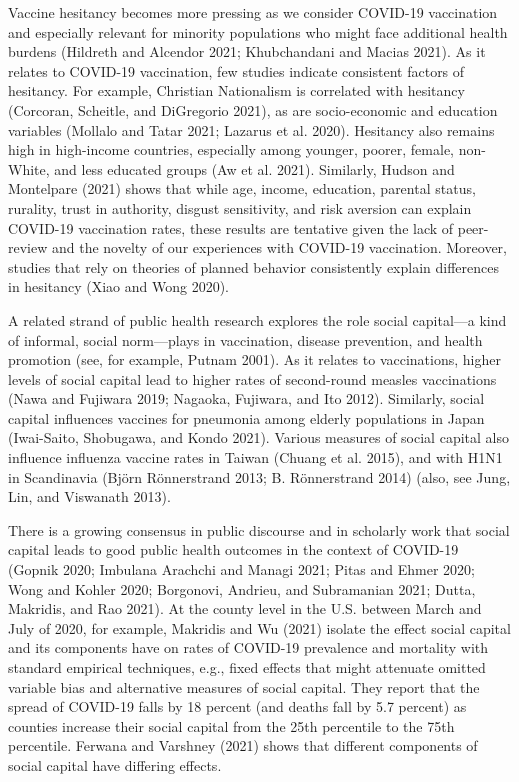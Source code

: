 \documentclass[
]{article}
\begin{document}
Vaccine hesitancy becomes more pressing as we consider COVID-19
vaccination and especially relevant for minority populations who might
face additional health burdens (Hildreth and Alcendor 2021; Khubchandani
and Macias 2021). As it relates to COVID-19 vaccination, few studies
indicate consistent factors of hesitancy. For example, Christian
Nationalism is correlated with hesitancy (Corcoran, Scheitle, and
DiGregorio 2021), as are socio-economic and education variables (Mollalo
and Tatar 2021; Lazarus et al. 2020). Hesitancy also remains high in
high-income countries, especially among younger, poorer, female,
non-White, and less educated groups (Aw et al. 2021). Similarly, Hudson
and Montelpare (2021) shows that while age, income, education, parental
status, rurality, trust in authority, disgust sensitivity, and risk
aversion can explain COVID-19 vaccination rates, these results are
tentative given the lack of peer-review and the novelty of our
experiences with COVID-19 vaccination. Moreover, studies that rely on
theories of planned behavior consistently explain differences in
hesitancy (Xiao and Wong 2020).

A related strand of public health research explores the role social
capital---a kind of informal, social norm---plays in vaccination,
disease prevention, and health promotion (see, for example, Putnam
2001). As it relates to vaccinations, higher levels of social capital
lead to higher rates of second-round measles vaccinations (Nawa and
Fujiwara 2019; Nagaoka, Fujiwara, and Ito 2012). Similarly, social
capital influences vaccines for pneumonia among elderly populations in
Japan (Iwai-Saito, Shobugawa, and Kondo 2021). Various measures of
social capital also influence influenza vaccine rates in Taiwan (Chuang
et al. 2015), and with H1N1 in Scandinavia (Björn Rönnerstrand 2013; B.
Rönnerstrand 2014) (also, see Jung, Lin, and Viswanath 2013).

There is a growing consensus in public discourse and in scholarly work
that social capital leads to good public health outcomes in the context
of COVID-19 (Gopnik 2020; Imbulana Arachchi and Managi 2021; Pitas and
Ehmer 2020; Wong and Kohler 2020; Borgonovi, Andrieu, and Subramanian
2021; Dutta, Makridis, and Rao 2021). At the county level in the U.S.
between March and July of 2020, for example, Makridis and Wu (2021)
isolate the effect social capital and its components have on rates of
COVID-19 prevalence and mortality with standard empirical techniques,
e.g., fixed effects that might attenuate omitted variable bias and
alternative measures of social capital. They report that the spread of
COVID-19 falls by 18 percent (and deaths fall by 5.7 percent) as
counties increase their social capital from the 25th percentile to the
75th percentile. Ferwana and Varshney (2021) shows that different
components of social capital have differing effects.
\end{document}

